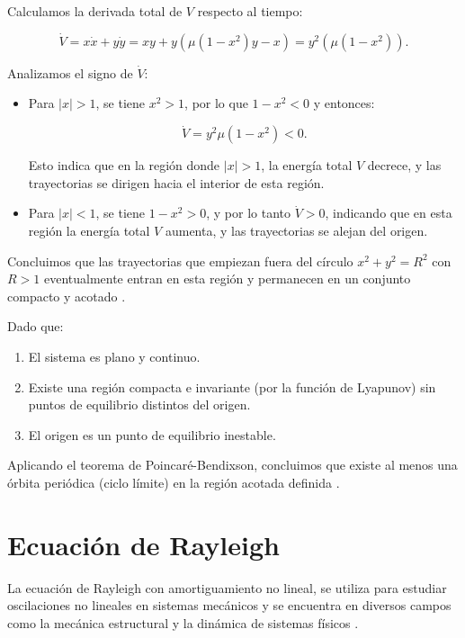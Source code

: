 Calculamos la derivada total de \( V \) respecto al tiempo:

\begin{equation}
    \dot{V} = x \dot{x} + y \dot{y} = x y + y \left( \mu (1 - x^2) y - x \right) = y^2 \left( \mu (1 - x^2) \right).
\end{equation}

Analizamos el signo de \( \dot{V} \):

\begin{itemize}
    \item Para \( |x| > 1 \), se tiene \( x^2 > 1 \), por lo que \( 1 - x^2 < 0 \) y entonces:

    \begin{equation}
        \dot{V} = y^2 \mu (1 - x^2) < 0.
    \end{equation}

    Esto indica que en la región donde \( |x| > 1 \), la energía total \( V \) decrece, y las trayectorias se dirigen hacia el interior de esta región.

    \item Para \( |x| < 1 \), se tiene \( 1 - x^2 > 0 \), y por lo tanto \( \dot{V} > 0 \), indicando que en esta región la energía total \( V \) aumenta, y las trayectorias se alejan del origen.
\end{itemize}

Concluimos que las trayectorias que empiezan fuera del círculo \( x^2 + y^2 = R^2 \) con \( R > 1 \) eventualmente entran en esta región y permanecen en un conjunto compacto y acotado \cite{hahn1967stability}.

Dado que:

\begin{enumerate}
    \item El sistema es plano y continuo.
    \item Existe una región compacta e invariante (por la función de Lyapunov) sin puntos de equilibrio distintos del origen.
    \item El origen es un punto de equilibrio inestable.
\end{enumerate}

Aplicando el teorema de Poincaré-Bendixson, concluimos que existe al menos una órbita periódica (ciclo límite) en la región acotada definida \cite{lasalle1961stability}.
\section{Ecuación de Rayleigh}
La ecuación de Rayleigh con amortiguamiento no lineal, se utiliza
para estudiar oscilaciones no lineales en sistemas mecánicos y se encuentra en
diversos campos como la mecánica estructural y la dinámica de sistemas físicos \cite{rayleigh1883theory}.


